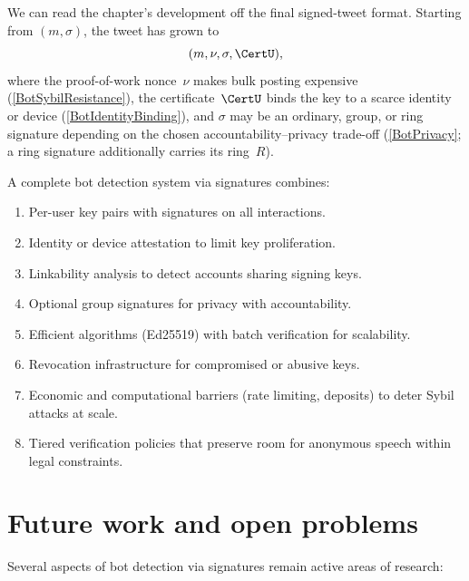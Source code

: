 We can read the chapter's development off the final signed-tweet format.
Starting from \((m, \sigma)\), the tweet has grown to
\[
  (m, \nu, \sigma, \CertU),
\]
where the proof-of-work nonce~\(\nu\) makes bulk posting expensive
(\cref{BotSybilResistance}), the certificate~\(\CertU\) binds the key to
a scarce identity or device (\cref{BotIdentityBinding}), and \(\sigma\)
may be an ordinary, group, or ring signature depending on the chosen
accountability--privacy trade-off (\cref{BotPrivacy}; a ring signature
additionally carries its ring~\(R\)).

A complete bot detection system via signatures combines:
\begin{enumerate}
  \item Per-user key pairs with signatures on all interactions.
  \item Identity or device attestation to limit key proliferation.
  \item Linkability analysis to detect accounts sharing signing keys.
  \item Optional group signatures for privacy with accountability.
  \item Efficient algorithms (Ed25519) with batch verification for
    scalability.
  \item Revocation infrastructure for compromised or abusive keys.
  \item Economic and computational barriers (rate limiting, deposits) to
    deter Sybil attacks at scale.
  \item Tiered verification policies that preserve room for anonymous
    speech within legal constraints.
\end{enumerate}


\section{Future work and open problems}\label{BotFutureWork}


Several aspects of bot detection via signatures remain active areas of
research:

